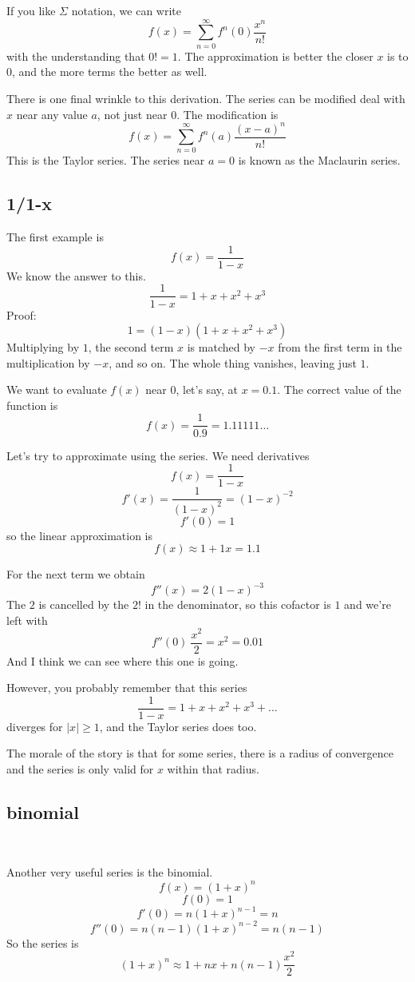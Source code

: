\documentclass[11pt, oneside]{article}
\begin{document}
If you like $\Sigma$ notation, we can write
\[ f(x) = \sum_{n=0}^{\infty} f^n(0) \frac{x^n}{n!} \]
with the understanding that $0! = 1$.  The approximation is better the closer $x$ is to $0$, and the more terms the better as well.  

There is one final wrinkle to this derivation.  The series can be modified deal with $x$ near any value $a$, not just near $0$.  The modification is
\[ f(x) = \sum_{n=0}^{\infty} f^n(a) \frac{(x-a)^n}{n!} \]
This is the Taylor series.  The series near $a=0$ is known as the Maclaurin series.

\subsection*{1/1-x}
The first example is
\[ f(x) = \frac{1}{1-x} \]
We know the answer to this.
\[ \frac{1}{1-x} = 1 + x + x^2 + x^3 \]
Proof:
\[ 1 = (1-x)(1 + x + x^2 + x^3) \]
Multiplying by $1$, the second term $x$ is matched by $-x$ from the first term in the multiplication by $-x$, and so on.  The whole thing vanishes, leaving just $1$.

We want to evaluate $f(x)$ near $0$, let's say, at $x=0.1$.  The correct value of the function is
\[ f(x) = \frac{1}{0.9} = 1.11111 \dots \]

Let's try to approximate using the series.  We need derivatives
\[ f(x) = \frac{1}{1-x} \]
\[ f'(x) = \frac{1}{(1-x)^2} = (1-x)^{-2} \]
\[ f'(0) = 1 \]
so the linear approximation is
\[ f(x) \approx 1 + 1x = 1.1 \]

For the next term we obtain
\[ f''(x) = 2(1-x)^{-3} \]
The $2$ is cancelled by the $2!$ in the denominator, so this cofactor is $1$ and we're left with
\[ f''(0)\ \frac{x^2}{2} = x^2 = 0.01 \]
And I think we can see where this one is going.

However, you probably remember that this series
\[ \frac{1}{1 - x} = 1 + x + x^2 + x^3 + \dots \]
diverges for $|x| \ge 1$, and the Taylor series does too.

The morale of the story is that for some series, there is a radius of convergence and the series is only valid for $x$ within that radius.

\subsection*{binomial}\

Another very useful series is the binomial.
\[ f(x) = (1 + x)^n \]
\[ f(0) = 1 \]
\[ f'(0) = n(1 + x)^{n-1} = n \]
\[ f''(0) = n(n-1)(1 + x)^{n-2} = n(n-1) \]
So the series is
\[ (1 + x)^n \approx 1 + nx + n(n-1) \frac{x^2}{2} \]
\end{document}
